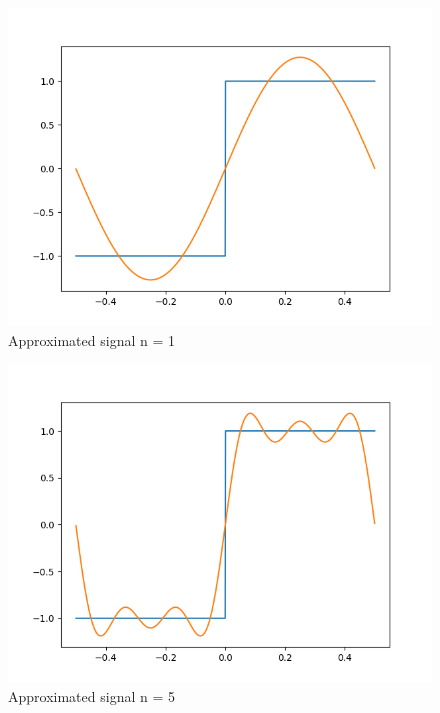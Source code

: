 \documentclass[10pt,a4paper, margin=1in]{article}
\begin{document}
\begin{enumerate}
\begin{enumerate}
        \begin{figure}[H]
            \includegraphics[scale=0.75]{approximated_n=1.png}
            \caption{Approximated signal n = 1}
        \end{figure}
        \begin{figure}[H]
            \includegraphics[scale=0.75]{approximated_n=5.png}
            \caption{Approximated signal n = 5}
        \end{figure}
        \begin{figure}[H]

\end{figure}
\end{enumerate}
\end{enumerate}
\end{document}
